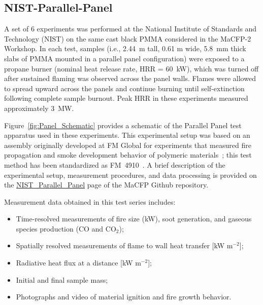 \documentclass[12pt]{article}
\begin{document}
\FloatBarrier
\subsection {NIST-Parallel-Panel}
A set of 6 experiments was performed at the National Institute of Standards and Technology (NIST) on the same cast black PMMA considered in the MaCFP-2 Workshop. In each test, samples (i.e., 2.44~m tall, 0.61 m wide, 5.8~mm thick slabs of PMMA mounted in a parallel panel configuration) were exposed to a propane burner (nominal heat release rate, HRR = 60~kW), which was turned off after sustained flaming was observed across the panel walls. Flames were allowed to spread upward across the panels and continue burning until self-extinction following complete sample burnout. Peak HRR in these experiments measured approximately 3~MW.

Figure~\ref{fig:Panel_Schematic} provides a schematic of the Parallel Panel test apparatus used in these experiments. This experimental setup was based on an assembly originally developed at FM Global for experiments that measured fire propagation and smoke development behavior of polymeric materials~\cite{tewarson2001flammability}; this test method has been standardized as FM~4910~\cite{FM-4910standard}. A brief description of the experimental setup, measurement procedures, and data processing is provided on the \href{https://github.com/MaCFP/macfp-db/tree/master/Fire_Growth/NIST_Parallel_Panel}{NIST\_Parallel\_Panel} page of the MaCFP Github repository.

\clearpage
Measurement data obtained in this test series includes:
\begin{itemize}[noitemsep]
\item Time-resolved measurements of fire size (kW), soot generation, and gaseous species production (CO and CO$_2$);
\item Spatially resolved measurements of flame to wall heat transfer [kW m$^{-2}$];
\item Radiative heat flux at a distance [kW m$^{-2}$];
\item Initial and final sample mass;
\item Photographs and video of material ignition and fire growth behavior.
\end{itemize}
\end{document}
